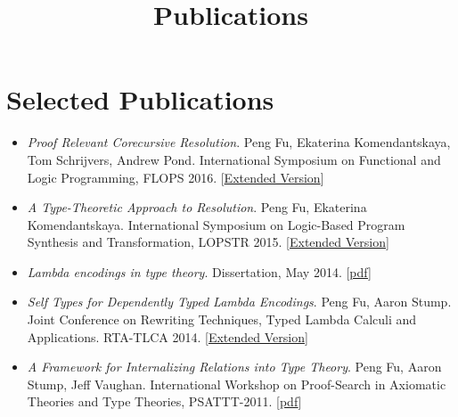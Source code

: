 \documentclass[10pt]{article}
\title{\bfseries\Large Publications}
\date{}
\begin{document}
\maketitle
\vspace{-4em}

\vspace{20pt}





\section*{Selected Publications}

\begin{itemize}
\item \textit{Proof Relevant Corecursive Resolution}. Peng Fu, Ekaterina Komendantskaya, Tom Schrijvers, Andrew Pond. International Symposium on Functional and Logic Programming, FLOPS 2016. 
  [\href{../../document/papers/corec.pdf}{Extended Version}]
\item \textit{A Type-Theoretic Approach to Resolution}. Peng Fu, Ekaterina Komendantskaya. International Symposium on Logic-Based Program Synthesis and Transformation, LOPSTR 2015. [\href{../../document/papers/tm-lp.pdf}{Extended Version}]

\item \textit{Lambda encodings in type theory}. Dissertation, May 2014. [\href{../../document/papers/dissertation.pdf}{pdf}]

\item \textit{Self Types for Dependently Typed Lambda Encodings}. Peng Fu, Aaron Stump. Joint Conference on Rewriting Techniques, Typed Lambda Calculi and Applications. RTA-TLCA 2014. [\href{../../document/papers/rta-tlca.pdf}{Extended Version}]

\item \textit{A Framework for Internalizing Relations into Type Theory}. Peng Fu, Aaron Stump, Jeff Vaughan. International Workshop on Proof-Search in Axiomatic Theories and Type Theories, PSATTT-2011. [\href{../../document/papers/psattt-paper.pdf}{pdf}]
  
\end{itemize}
\end{document}
